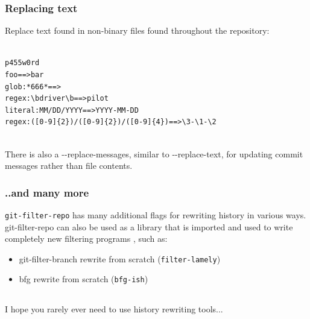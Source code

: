 \documentclass[compress,t,aspectratio=169]{beamer}
\begin{document}

\begin{frame}[containsverbatim]
  \frametitle{Replacing text}

  Replace text found in non-binary files found throughout the repository:\\
  \\
  {\footnotesize
  \begin{verbatim}
p455w0rd
foo==>bar
glob:*666*==>
regex:\bdriver\b==>pilot
literal:MM/DD/YYYY==>YYYY-MM-DD
regex:([0-9]{2})/([0-9]{2})/([0-9]{4})==>\3-\1-\2
  \end{verbatim}
  }
  \vspace*{-0.5\baselineskip}
  \\

  \vspace*{\baselineskip}
  There is also a  {-}{-}replace-messages, similar to {-}{-}replace-text, for
  updating commit messages rather than file contents.

\end{frame}


\begin{frame}
  \frametitle{..and many more}

  \vfill
  \texttt{git-filter-repo} has many additional flags for rewriting
  history in various ways.
  \pause
  \vfill
  git-filter-repo can also be used as a library that is imported and used
  to write completely new filtering programs
  \pause
  , such as:
  \begin{itemize}
    \item git-filter-branch rewrite from scratch (\texttt{filter-lamely})
    \item bfg rewrite from scratch (\texttt{bfg-ish})
  \end{itemize}


\end{frame}


\subsection{}
\begin{frame}
  \vfill
  {\Huge
  \begin{center}I hope you rarely ever need to use history rewriting tools...\end{center}
  \vfill
  }
  \vfill
\end{frame}

\end{document}
